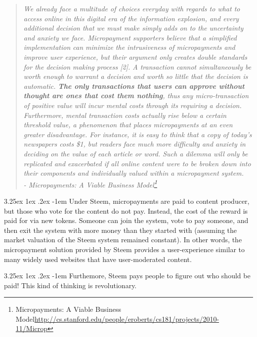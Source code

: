 \documentclass{article}
\makeatletter
\renewcommand\paragraph{\@startsection{paragraph}{5}{\z@}%
  {3.25ex \@plus1ex \@minus.2ex}%
  {-1em}%
  {\normalfont\normalsize\bfseries}}
\makeatother
\begin{document}
            \begin{quote}
                    \textit{We already face a multitude of choices everyday with regards to what to access online in this digital era of the information explosion, and every additional decision that we must make simply adds on to the uncertainty and anxiety we face. Micropayment supporters believe that a simplified implementation can minimize the intrusiveness of micropayments and improve user experience, but their argument only creates double standards for the decision making process [2]. A transaction cannot simultaneously be worth enough to warrant a decision and worth so little that the decision is automatic. \textbf{The only transactions that users can approve without thought are ones that cost them nothing}, thus any micro-transaction of positive value will incur mental costs through its requiring a decision. Furthermore, mental transaction costs actually rise below a certain threshold value, a phenomenon that places micropayments at an even greater disadvantage. For instance, it is easy to think that a copy of today's newspapers costs \$1, but readers face much more difficulty and anxiety in deciding on the value of each article or word. Such a dilemma will only be replicated and exacerbated if all online content were to be broken down into their components and individually valued within a micropayment system.}\\

                    \textit{- Micropayments: A Viable Business Model\footnote{Micropayments: A Viable Business Model\newline\url{http://cs.stanford.edu/people/eroberts/cs181/projects/2010-11/Microp}}}
            \end{quote}

            \paragraph{}
                Under Steem, micropayments are paid to content producer, but those who vote for the content do not pay. Instead, the cost of the reward is paid for via new tokens. Someone can join the system, vote to pay someone, and then exit the system with more money than they started with (assuming the market valuation of the Steem system remained constant). In other words, the micropayment solution provided by Steem provides a user-experience similar to many widely used websites that have user-moderated content.

            \paragraph{}
                Furthemore, Steem pays people to figure out who should be paid! This kind of thinking is revolutionary.
\end{document}
